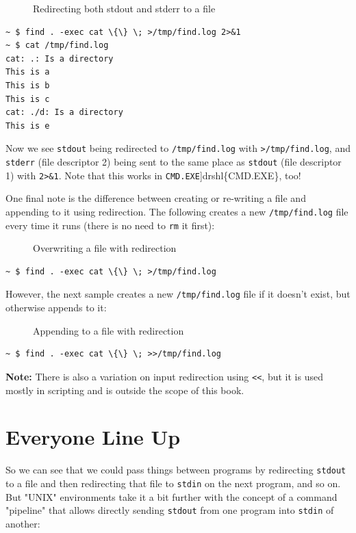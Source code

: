 \documentclass[10pt,]{book}
\numberwithin{figure}{chapter}
\DeclareRobustCommand{\drcap}[1]{\begin{figure}[H]\caption{#1}\end{figure}}
\begin{document}
\drcap{Redirecting both stdout and stderr to a file}

\begin{verbatim}
~ $ find . -exec cat \{\} \; >/tmp/find.log 2>&1
~ $ cat /tmp/find.log
cat: .: Is a directory
This is a
This is b
This is c
cat: ./d: Is a directory
This is e
\end{verbatim}

Now we see \texttt{stdout} being redirected to \texttt{/tmp/find.log}
with \texttt{\textgreater{}/tmp/find.log}, and \texttt{stderr} (file
descriptor 2) being sent to the same place as \texttt{stdout} (file
descriptor 1) with \texttt{2\textgreater{}\&1}. Note that this works in
\texttt{CMD.EXE}{]}drshl\{CMD.EXE\}, too!

One final note is the difference between creating or re-writing a file
and appending to it using redirection. The following creates a new
\texttt{/tmp/find.log} file every time it runs (there is no need to
\texttt{rm} it first):

\drcap{Overwriting a file with redirection}

\begin{verbatim}
~ $ find . -exec cat \{\} \; >/tmp/find.log
\end{verbatim}

However, the next sample creates a new \texttt{/tmp/find.log} file if it
doesn't exist, but otherwise appends to it:

\drcap{Appending to a file with redirection}

\begin{verbatim}
~ $ find . -exec cat \{\} \; >>/tmp/find.log
\end{verbatim}

\textbf{Note:} There is also a variation on input redirection using
\texttt{\textless{}\textless{}}, but it is used mostly in scripting and
is outside the scope of this book.

\section*{Everyone Line Up}\label{everyone-line-up}

So we can see that we could pass things between programs by redirecting
\texttt{stdout} to a file and then redirecting that file to
\texttt{stdin} on the next program, and so on. But "UNIX" environments
take it a bit further with the concept of a command "pipeline" that
allows directly sending \texttt{stdout} from one program into
\texttt{stdin} of another:
\end{document}

